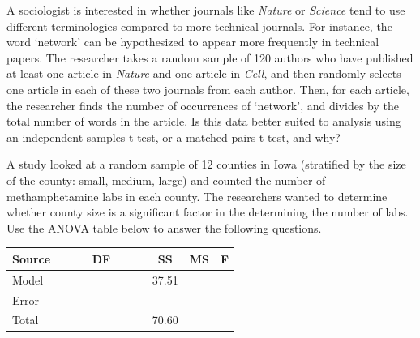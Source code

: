 \documentclass[11pt]{exam}
\begin{document}
\begin{questions}

\newpage
\question A sociologist is interested in whether journals like \textit{Nature} or \textit{Science} tend to use different terminologies compared to more technical journals. For instance, the word `network' can be hypothesized to appear more frequently in technical papers. The researcher takes a random sample of 120 authors who have published at least one article in \textit{Nature} and one article in \textit{Cell}, and then randomly selects one article in each of these two journals from each author. Then, for each article, the researcher finds the number of occurrences of `network', and divides by the total number of words in the article. Is this data better suited to analysis using an independent samples t-test, or a matched pairs t-test, and why?
\vfill


\question A study looked at a random sample of 12 counties in Iowa (stratified by the size of the county: small, medium, large) and counted the number of methamphetamine labs in each county. The researchers wanted to determine whether county size is a significant factor in the determining the number of labs. Use the ANOVA table below to answer the following questions. 

\begin{center}
\renewcommand{\arraystretch}{2.0}
\begin{tabular}{|l|c|c|c|c|}
\hline
Source & ~~~~ DF ~~~~ & SS & MS & F \\ \hline
Model & ~ & 37.51 & \hspace*{1.1in} & \hspace*{1.1in} \\ \hline 
Error & ~  & \hspace*{1.1in} & ~ & ~ \\ \hline
Total & ~ & 70.60 & ~ & ~ \\ \hline
\end{tabular}
\end{center}
\begin{parts}

\end{parts}
\end{questions}
\end{document}
